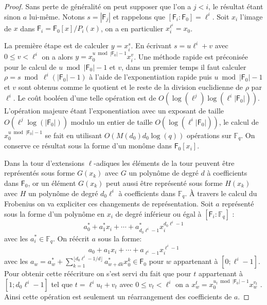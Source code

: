 \documentclass[10pt,a4paper]{book}
\theoremstyle{plain}
\theoremstyle{definition}
\theoremstyle{definition}
\theoremstyle{definition}
\theoremstyle{definition}
\theoremstyle{remark}
\theoremstyle{remark}
\begin{document}
\begin{proof}
Sans perte de généralité on peut supposer que l'on a $j<i$, le résultat étant sinon $a$ lui-même. Notons $s= |\mathsf{F}_j|$ et rappelons que $[\mathsf{F}_i:\mathsf{F}_0]=\ell^{i}$. Soit $x_i$ l'image de $x$ dans $\mathsf{F}_i=\mathsf{F}_0[x]/P_i(x)$, on a en particulier $x_i^{\ell^i}=x_0$.

La première étape est de calculer $y=x_i^s$. En écrivant $s=u\ell^i+v$ avec $0 \leqslant v < \ell^i$ on a alors $y=x_0^{u \bmod |\mathsf{F}_0|-1}x_i^v$. 
Une méthode rapide est préconisée pour le calcul de $u \bmod |\mathsf{F}_0|-1$ et $v$, dans un premier temps il faut calculer $\rho=s \bmod \ell^i(|\mathsf{F}_0|-1)$ à l'aide de l'exponentiation rapide puis $u \bmod |\mathsf{F}_0|-1$ et $v$ sont obtenus comme le quotient et le reste de la division euclidienne   de $\rho$ par $\ell^i$. Le coût booléen d'une telle opération est de $O(\log(\ell^j)\log(\ell^{i}|\mathsf{F}_0|))$. L'opération majeure étant l'exponentiation avec un exposant de taille $O(\ell^{j}\log(|\mathsf{F}_0|))$ modulo un entier de taille $O(\log(\ell^{i}|\mathsf{F}_0|))$, le calcul de $x_0^{u \bmod |\mathsf{F}_0|-1}$ se fait en utilisant $O( M(d_0) d_0\log(q))$ opérations sur $\mathbb{F}_q$. On conserve ce résultat sous la forme d'un monôme dans $\mathsf{F}_0[x_i]$. 

Dans la tour d'extensions $\ell$-adiques les éléments de la tour peuvent être représentés sous forme $G(x_k)$ avec $G$ un polynôme de degré $d$ à coefficients dans $\mathsf{F}_0$, or un élément $G(x_k)$ peut aussi être représenté sous forme $H(x_k)$ avec $H$ un polynôme de degré $d_0\ell^i$ à coefficients dans $\mathbb{F}_q$. \`A travers le calcul du Frobenius on va expliciter ces changements de représentation. Soit $a$ représenté sous la forme d'un polynôme en $x_i$ de degré inférieur ou égal à $[\mathsf{F}_i:\mathbb{F}_q]$ : 
\begin{equation*}
a^*_0+a_1^*x_i+ \cdots + a^*_{d_0\ell^i-1}x_i^{d_0\ell^i-1}
\end{equation*}
avec les $a_i^* \in \mathbb{F}_q$. On réécrit $a$ sous la forme:
\begin{equation*}
a_0+a_1x_i+ \cdots + a_{\ell^i-1}x_i^{\ell^i-1}
\end{equation*}
avec les $a_w=a_w^* + \sum_{k=1}^{\lfloor d_0\ell^i-1/d \rfloor}a_{w+dk}^*x_0^k \in \mathsf{F}_0$ pour $w$ appartenant à $[0; \ell^i-1]$. Pour obtenir cette réécriture on s'est servi du fait que pour $t$ appartenant à $[1; d_0\ell^i-1]$ tel que $t=\ell^i u_t+v_t$ avec $0 \leqslant v_t<\ell^i$ on a $x_w^t=x_0^{u_t \bmod |\mathsf{F}_0|-1}x_w^{v_t}$ . Ainsi cette opération est seulement un réarrangement des coefficients de $a$.


\end{proof}
\end{document}
